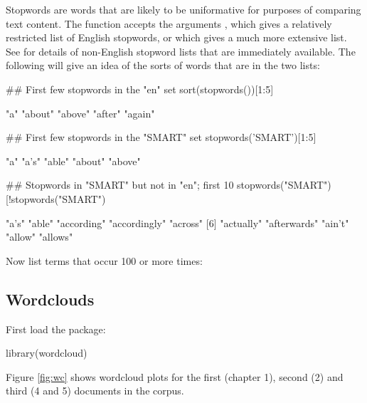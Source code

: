 Stopwords are words that are likely to be uniformative for purposes
of comparing text content.  The function  
accepts the arguments , which gives a relatively
restricted list of English stopwords, or  which
gives a much more extensive list.  See  for
details of non-English stopword lists that are immediately available.
The following will give an idea of the sorts of words that are in
the two lists:
\begin{Schunk}
\begin{Sinput}
## First few stopwords in the "en" set
sort(stopwords())[1:5]
\end{Sinput}
\begin{Soutput}
[1] "a"     "about" "above" "after" "again"
\end{Soutput}
\begin{Sinput}
## First few stopwords in the "SMART" set 
stopwords('SMART')[1:5]
\end{Sinput}
\begin{Soutput}
[1] "a"     "a's"   "able"  "about" "above"
\end{Soutput}
\begin{Sinput}
## Stopwords in "SMART" but not in "en"; first 10
stopwords("SMART")[!stopwords("SMART")%
\end{Sinput}
\begin{Soutput}
 [1] "a's"         "able"        "according"   "accordingly" "across"     
 [6] "actually"    "afterwards"  "ain't"       "allow"       "allows"     
\end{Soutput}
\end{Schunk}

Now list terms that occur 100 or more times:
\begin{fullwidth}

\end{fullwidth}

\subsection*{Wordclouds}

First load the  package:
\begin{Schunk}
\begin{Sinput}
library(wordcloud)
\end{Sinput}
\end{Schunk}

Figure \ref{fig:wc} shows wordcloud plots for the first (chapter 1),
second (2) and third (4 and 5) documents in the corpus.
\vspace*{15pt}


